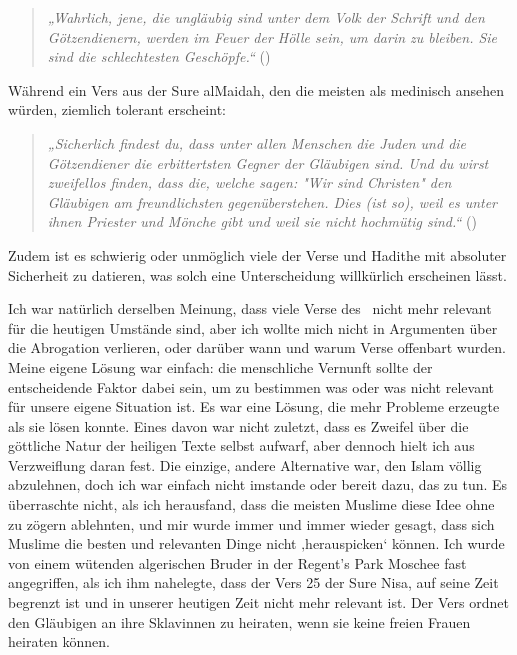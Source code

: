 \documentclass[12pt]{memoir}
\begin{document}
\begin{quote}
\emph{„Wahrlich, jene, die ungläubig sind unter dem Volk der Schrift
und den Götzendienern, werden im Feuer der Hölle sein, um darin zu bleiben.
Sie sind die schlechtesten Geschöpfe.“}
()
\end{quote}

Während ein Vers aus der Sure al\–Ma\´idah,
den die meisten als medinisch ansehen würden,
ziemlich tolerant erscheint:

\begin{quote}
\emph{„Sicherlich findest du, dass unter allen Menschen die Juden
und die Götzendiener die erbittertsten Gegner der Gläubigen sind.
Und du wirst zweifellos finden, dass die, welche sagen:
"Wir sind Christen" den Gläubigen am freundlichsten gegenüberstehen.
Dies (ist so), weil es unter ihnen Priester und Mönche gibt
und weil sie nicht hochmütig sind.“}
()
\end{quote}

Zudem ist es schwierig oder unmöglich viele der Verse und Hadithe
mit absoluter Sicherheit zu datieren,
was solch eine Unterscheidung willkürlich erscheinen lässt.

Ich war natürlich derselben Meinung, dass viele Verse des \Quran\
nicht mehr relevant für die heutigen Umstände sind,
aber ich wollte mich nicht in Argumenten über die Abrogation verlieren,
oder darüber wann und warum Verse offenbart wurden.
Meine eigene Lösung war einfach:
die menschliche Vernunft sollte der entscheidende Faktor dabei sein,
um zu bestimmen was oder was nicht relevant für unsere eigene Situation ist.
Es war eine Lösung, die mehr Probleme erzeugte als sie lösen konnte.
Eines davon war nicht zuletzt, dass es Zweifel über die göttliche Natur
der heiligen Texte selbst aufwarf,
aber dennoch hielt ich aus Verzweiflung daran fest.
Die einzige, andere Alternative war, den Islam völlig abzulehnen,
doch ich war einfach nicht imstande oder bereit dazu, das zu tun.
Es überraschte nicht, als ich herausfand,
dass die meisten Muslime diese Idee ohne zu zögern ablehnten,
und mir wurde immer und immer wieder gesagt,
dass sich Muslime die besten und relevanten Dinge nicht ‚herauspicken‘ können.
Ich wurde von einem wütenden algerischen Bruder
in der Regent’s Park Moschee fast angegriffen,
als ich ihm nahelegte, dass der Vers 25 der Sure Nisa,
auf seine Zeit begrenzt ist und in unserer heutigen Zeit nicht mehr relevant ist.
Der Vers ordnet den Gläubigen an ihre Sklavinnen zu heiraten,
wenn sie keine freien Frauen heiraten können.
\end{document}
